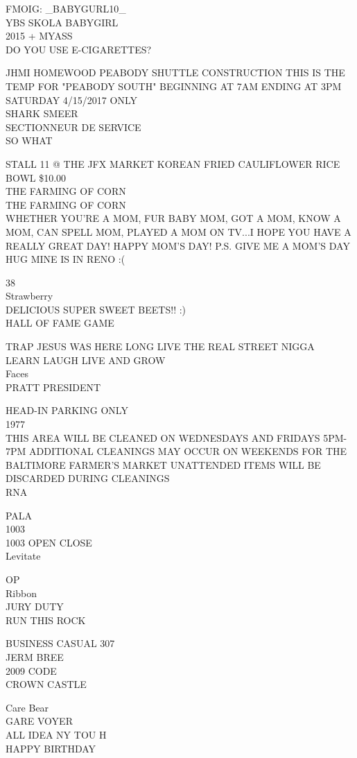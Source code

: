 \documentclass[10pt,letterpaper]{article}
\begin{document}
FMOIG: \_BABYGURL10\_\\
YBS SKOLA BABYGIRL\\
2015 + MYASS\\
DO YOU USE E{-}CIGARETTES?

JHMI HOMEWOOD PEABODY SHUTTLE CONSTRUCTION THIS IS THE TEMP FOR "PEABODY SOUTH" BEGINNING AT 7AM ENDING AT 3PM SATURDAY 4/15/2017 ONLY\\
SHARK SMEER\\
SECTIONNEUR DE SERVICE\\
SO WHAT

STALL 11 @ THE JFX MARKET KOREAN FRIED CAULIFLOWER RICE BOWL \$10.00\\
THE FARMING OF CORN\\
THE FARMING OF CORN\\
WHETHER YOU'RE A MOM, FUR BABY MOM, GOT A MOM, KNOW A MOM, CAN SPELL MOM, PLAYED A MOM ON TV...I HOPE YOU HAVE A REALLY GREAT DAY!  HAPPY MOM'S DAY!  P.S. GIVE ME A MOM'S DAY HUG MINE IS IN RENO :(

38\\
Strawberry\\
DELICIOUS SUPER SWEET BEETS!! :)\\
HALL OF FAME GAME

TRAP JESUS WAS HERE LONG LIVE THE REAL STREET NIGGA\\
LEARN LAUGH LIVE AND GROW\\
Faces\\
PRATT PRESIDENT

HEAD{-}IN PARKING ONLY\\
1977\\
THIS AREA WILL BE CLEANED ON WEDNESDAYS AND FRIDAYS 5PM{-}7PM ADDITIONAL CLEANINGS MAY OCCUR ON WEEKENDS FOR THE BALTIMORE FARMER'S MARKET UNATTENDED ITEMS WILL BE DISCARDED DURING CLEANINGS\\
RNA

PALA\\
1003\\
1003 OPEN CLOSE\\
Levitate

OP\\
Ribbon\\
JURY DUTY\\
RUN THIS ROCK

BUSINESS CASUAL 307\\
JERM BREE\\
2009 CODE\\
CROWN CASTLE

Care Bear\\
GARE VOYER\\
ALL IDEA NY TOU H\\
HAPPY BIRTHDAY
\end{document}
